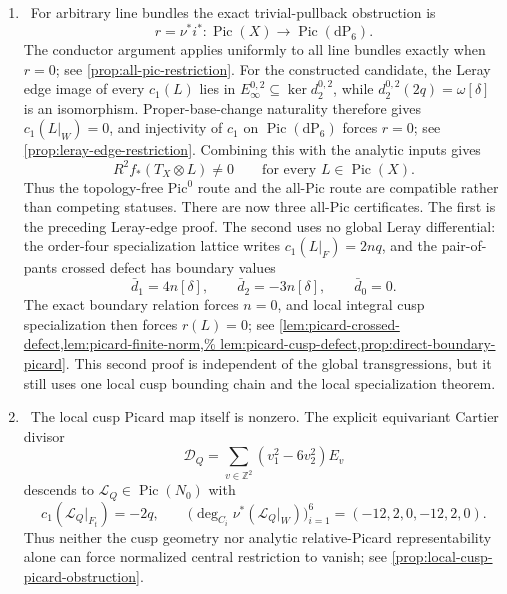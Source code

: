 \begin{enumerate}[leftmargin=1.8em]
\item \Verified\ For arbitrary line bundles the exact trivial-pullback
obstruction is
\[
 r=\nu^*i^*:\operatorname{Pic}(X)\longrightarrow
 \operatorname{Pic}(\mathrm{dP}_6).
\]
The conductor argument applies uniformly to all line bundles exactly when
$r=0$; see \cref{prop:all-pic-restriction}.  For the constructed candidate,
the Leray edge image of every $c_1(L)$ lies in
$E_\infty^{0,2}\subseteq\ker d_2^{0,2}$, while
$d_2^{0,2}(2q)=\omega[\delta]$ is an isomorphism.  Proper-base-change
naturality therefore gives $c_1(L|_W)=0$, and injectivity of $c_1$ on
$\operatorname{Pic}(\mathrm{dP}_6)$ forces $r=0$; see
\cref{prop:leray-edge-restriction}.  Combining this with the analytic inputs
gives
\[
 R^2f_*(T_X\otimes L)\ne0
 \qquad\text{for every }L\in\operatorname{Pic}(X).
\]
Thus the topology-free Pic$^0$ route and the all-Pic route are compatible
rather than competing statuses.  There are now three all-Pic certificates.
The first is the preceding Leray-edge proof.  The second uses no global
Leray differential: the order-four specialization lattice writes
$c_1(L|_F)=2nq$, and the pair-of-pants crossed defect has boundary values
\[
 \bar d_1=4n[\delta],\qquad
 \bar d_2=-3n[\delta],\qquad
 \bar d_0=0.
\]
The exact boundary relation forces $n=0$, and local integral cusp
specialization then forces $r(L)=0$; see
\cref{lem:picard-crossed-defect,lem:picard-finite-norm,%
lem:picard-cusp-defect,prop:direct-boundary-picard}.  This second proof is
independent of the global transgressions, but it still uses one local cusp
bounding chain and the local specialization theorem.

\item \Verified\ The local cusp Picard map itself is nonzero.  The explicit
equivariant Cartier divisor
\[
 \mathcal D_Q=\sum_{v\in\mathbb Z^2}(v_1^2-6v_2^2)E_v
\]
descends to $\mathcal L_Q\in\operatorname{Pic}(N_0)$ with
\[
 c_1(\mathcal L_Q|_{F_t})=-2q,\qquad
 \bigl(\deg_{C_i}\nu^*(\mathcal L_Q|_W)\bigr)_{i=1}^6
 =(-12,2,0,-12,2,0).
\]
Thus neither the cusp geometry nor analytic relative-Picard
representability alone can force normalized central restriction to vanish;
see \cref{prop:local-cusp-picard-obstruction}.


\end{enumerate}
